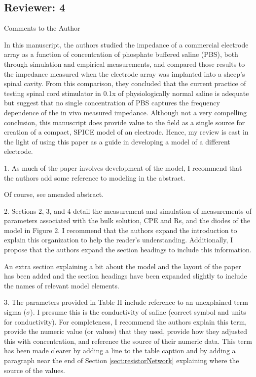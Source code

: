 \documentclass[journal, a4paper]{IEEEtran}
\begin{document}
\subsection*{Reviewer: 4}

Comments to the Author

{
    \color{OliveGreen}
    In this manuscript, the authors studied the impedance of a commercial electrode array as a function of concentration of phosphate buffered saline (PBS), both through simulation and empirical measurements, and compared those results to the impedance measured when the electrode array was implanted into a sheep's spinal cavity. From this comparison, they concluded that the current practice of testing spinal cord stimulator in 0.1x of physiologically normal saline is adequate but suggest that no single concentration of PBS captures the frequency dependence of the in vivo measured impedance. Although not a very compelling conclusion, this manuscript does provide value to the field as a single source for creation of a compact, SPICE model of an electrode. Hence, my review is cast in the light of using this paper as a guide in developing a model of a different electrode.

    1. As much of the paper involves development of the model, I recommend that the authors add some reference to modeling in the abstract.

    {
        \color{blue}
        Of course, see amended abstract.
    }

    2. Sections 2, 3, and 4 detail the measurement and simulation of measurements of parameters associated with the bulk solution, CPE and Rs, and the diodes of the model in Figure 2. I recommend that the authors expand the introduction to explain this organization to help the reader's understanding. Additionally, I propose that the authors expand the section headings to include this information.

    {
        \color{blue}
        An extra section explaining a bit about the model and the layout of the paper has been added and the section headings have been expanded slightly to include the names of relevant model elements.
    }

    3. The parameters provided in Table II include reference to an unexplained term sigma ($\sigma$). I presume this is the conductivity of saline (correct symbol and units for conductivity). For completeness, I recommend the authors explain this term, provide the numeric value (or values) that they used, provide how they adjusted this with concentration, and reference the source of their numeric data.
    {
        \color{blue}
        This term has been made clearer by adding a line to the table caption and by adding a paragraph near the end of Section \ref{sect:resistorNetwork} explaining where the source of the values.
    }

}
\end{document}
